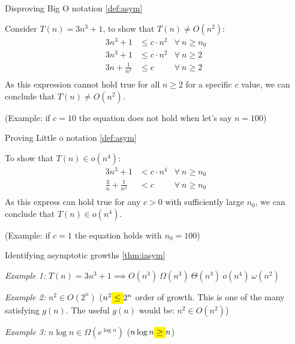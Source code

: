 \begin{example}
    \label{eg:asym_1}
    {Disproving Big O notation} \ref{def:asym}

    Consider $T(n) = 3n^3 + 1$, to show that $T(n) \neq O(n^2)$:
    \begin{align*}
        3n^3 + 1           & \leq c \cdot n^2 & \forall\ n \geq n_0 \\
        3n^3 + 1           & \leq c\cdot n^2  & \forall\ n \geq 2   \\
        3n + \frac{1}{n^2} & \leq c           & \forall\ n \geq 2   \\
    \end{align*}
    As this expression cannot hold true for all $n \geq 2$ for a specific $c$ value, we can conclude that $T(n) \neq O(n^2)$.

    (Example: if $c = 10$ the equation does not hold when let's say $n = 100$)
\end{example}

\begin{example}
    \label{eg:asym_2}
    {Proving Little o notation} \ref{def:asym}

    To show that $T(n) \in o(n^4)$:
    \begin{align*}
        3n^3 + 1                    & < c \cdot n^4 & \forall\ n \geq n_0 \\
        \frac{3}{n} + \frac{1}{n^4} & < c           & \forall\ n \geq n_0 \\
    \end{align*}
    As this express can hold true for any $c > 0$ with sufficiently large $n_0$, we can conclude that $T(n) \in o(n^4)$.

    (Example: if $c = 1$ the equation holds with $n_0 = 100$)
\end{example}

\begin{example}
    \label{eg:iasym_1}
    Identifying asymptotic growths \ref{thm:iasym}

    \textit{Example 1: }$T(n)=3n^3+1\implies O(n^3)\ \Omega(n^3)\ \Theta(n^3)\ o(n^4)\ \omega(n^2)$

    \textit{Example 2: }$n^2 \in O(2^n)$ ($n^2 \mathcolorbox{yellow}{\leq} 2^n$ order of growth. This is one of the many satisfying $g(n)$. The useful $g(n)$ would be: $n^2 \in O(n^2)$)

    \textit{Example 3: }$n\log n \in \Omega(e^{\log n})$  ($n\log n \mathcolorbox{yellow}{\geq} n$)
\end{example}

